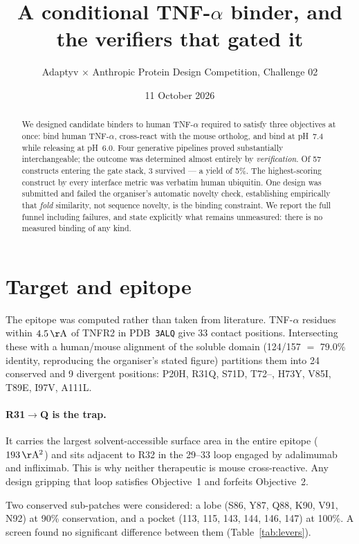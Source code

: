\documentclass[11pt,a4paper]{article}
\title{A conditional TNF-$\alpha$ binder, and the verifiers that gated it}
\author{Adaptyv $\times$ Anthropic Protein Design Competition, Challenge 02}
\date{11 October 2026}
\newcommand{\unit}[1]{\,\mathrm{#1}}
\begin{document}
\maketitle

\begin{abstract}
We designed candidate binders to human TNF-$\alpha$ required to satisfy three objectives at
once: bind human TNF-$\alpha$, cross-react with the mouse ortholog, and bind at pH~7.4 while
releasing at pH~6.0. Four generative pipelines proved substantially interchangeable; the
outcome was determined almost entirely by \emph{verification}. Of 57 constructs entering the
gate stack, 3 survived --- a yield of 5\%. The highest-scoring construct by every interface
metric was verbatim human ubiquitin. One design was submitted and failed the organiser's
automatic novelty check, establishing empirically that \emph{fold} similarity, not sequence
novelty, is the binding constraint. We report the full funnel including failures, and state
explicitly what remains unmeasured: there is no measured binding of any kind.
\end{abstract}

\section{Target and epitope}

The epitope was computed rather than taken from literature. TNF-$\alpha$ residues within
$4.5\unit{\AA}$ of TNFR2 in PDB~\texttt{3ALQ} give 33 contact positions. Intersecting these
with a human/mouse alignment of the soluble domain (124/157 $=$ 79.0\% identity, reproducing
the organiser's stated figure) partitions them into 24 conserved and 9 divergent positions:
P20H, R31Q, S71D, T72--, H73Y, V85I, T89E, I97V, A111L.

\paragraph{R31$\rightarrow$Q is the trap.} It carries the largest solvent-accessible surface
area in the entire epitope ($193\unit{\AA^2}$) and sits adjacent to R32 in the 29--33 loop
engaged by adalimumab and infliximab. This is why neither therapeutic is mouse cross-reactive.
Any design gripping that loop satisfies Objective~1 and forfeits Objective~2.

Two conserved sub-patches were considered: a lobe (S86, Y87, Q88, K90, V91, N92) at 90\%
conservation, and a pocket (113, 115, 143, 144, 146, 147) at 100\%. A screen found no
significant difference between them (Table~\ref{tab:levers}).
\end{document}
